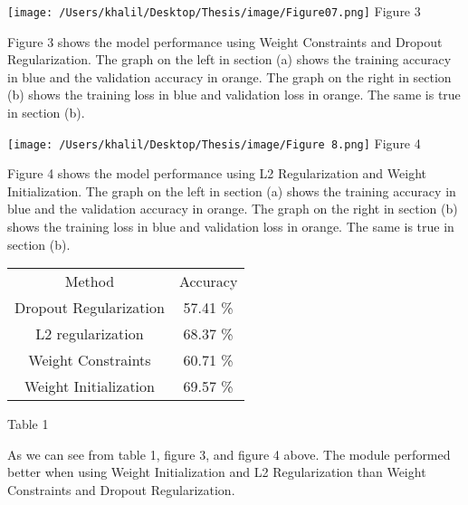 \documentclass[oneside,12pt,article]{article}
\begin{document}
\begin{center}
\texttt{[image: /Users/khalil/Desktop/Thesis/image/Figure07.png]} 
\newline Figure 3
\end{center} 
Figure 3 shows the model performance using Weight Constraints and Dropout Regularization. The graph on the left in section (a) shows the training accuracy in blue and the validation accuracy in orange. The graph on the right in section (b) shows the training loss in blue and validation loss in orange. The same is true in section (b). 




 \begin{center}
\texttt{[image: /Users/khalil/Desktop/Thesis/image/Figure 8.png]} 
\newline Figure 4 
\end{center} 
Figure 4 shows the model performance using L2 Regularization and Weight Initialization. The graph on the left in section (a) shows the training accuracy in blue and the validation accuracy in orange. The graph on the right in section (b) shows the training loss in blue and validation loss in orange. The same is true in section (b). 


\begin{center}
\begin{tabular}{ |c|c|} 
 \hline
 Method & Accuracy \\ 
 Dropout Regularization & 57.41 \% \\ 
 L2 regularization & 68.37 \% \\ 
 Weight Constraints & 60.71 \%\\ 
 Weight Initialization & 69.57 \% \\ 
 \hline
\end{tabular}
\begin{center}
 Table 1
 \end{center}
\end{center}
As we can see from table 1, figure 3, and figure 4 above. The module performed better when using Weight Initialization and L2 Regularization than Weight Constraints and Dropout Regularization.
 
\end{document}
